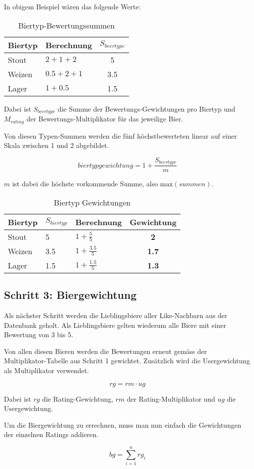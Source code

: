 \documentclass[10pt,a4paper]{scrartcl}
\begin{document}
In obigem Beispiel wären das folgende Werte:

\begin{table}[h!]
	\begin{center}
		\begin{tabular}{llc}
			\toprule
			Biertyp & Berechnung & $S_{beertype}$ \\
			\midrule
			Stout  & $2 + 1 + 2$   & 5 \\
			Weizen & $0.5 + 2 + 1$ & 3.5 \\
			Lager  & $1 + 0.5$     & 1.5 \\
			\bottomrule
		\end{tabular}
	\end{center}
	\caption{Biertyp-Bewertungssummen}
	\label{table:biertyp-bewertungs-summen}
\end{table}

Dabei ist $S_{beertype}$ die Summe der Bewertungs-Gewichtungen pro Biertyp und $M_{rating}$ der Bewertungs-Multiplikator für das jeweilige Bier.

Von diesen Typen-Summen werden die fünf höchstbewerteten linear auf einer Skala zwischen 1 und 2
abgebildet.

$$biertypgewichtung = 1 + \frac{S_{beertype}}{m}$$

$m$ ist dabei die höchste vorkommende Summe, also $\textrm{max}(summen)$.

\begin{table}[h!]
	\begin{center}
		\begin{tabular}{lllc}
			\toprule
			Biertyp & $S_{biertyp}$ & Berechnung & Gewichtung \\
			\midrule
			Stout  & 5   & $1 + \frac{5}{5}$   & \textbf{2} \\
			Weizen & 3.5 & $1 + \frac{3.5}{5}$ & \textbf{1.7}   \\
			Lager  & 1.5 & $1 + \frac{1.5}{5}$ & \textbf{1.3} \\
			\bottomrule
		\end{tabular}
	\end{center}
	\label{like-nachbar-multiplikatoren}
	\caption{Biertyp Gewichtungen}
\end{table}



\subsection{Schritt 3: Biergewichtung}

Als nächster Schritt werden die Lieblingsbiere aller Like-Nachbarn aus der Datenbank geholt. Als
Lieblingsbiere gelten wiederum alle Biere mit einer Bewertung von 3 bis 5.

Von allen diesen Bieren werden die Bewertungen erneut gemäss der Multiplikator-Tabelle aus Schritt
1 gewichtet. Zusätzlich wird die Usergewichtung als Multiplikator verwendet.

$$rg = rm \cdot ug$$

Dabei ist $rg$ die Rating-Gewichtung, $rm$ der Rating-Multiplikator und $ug$ die Usergewichtung.

Um die Biergewichtung zu errechnen, muss man nun einfach die Gewichtungen der einzelnen Ratings
addieren.

$$bg = \sum_{i=1}^n rg_i$$
\end{document}
